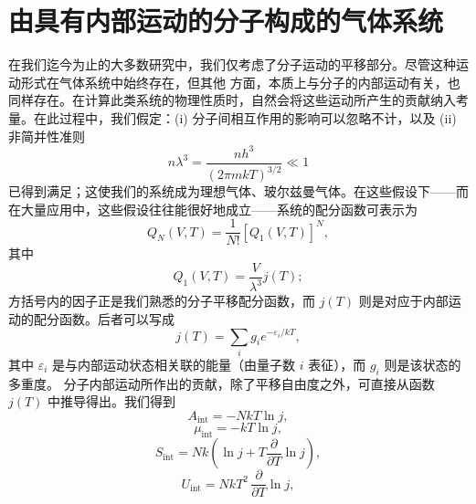 \section{由具有内部运动的分子构成的气体系统}\label{ux7531ux5177ux6709ux5185ux90e8ux8fd0ux52a8ux7684ux5206ux5b50ux6784ux6210ux7684ux6c14ux4f53ux7cfbux7edf}
在我们迄今为止的大多数研究中，我们仅考虑了分子运动的平移部分。尽管这种运动形式在气体系统中始终存在，但其他
方面，本质上与分子的内部运动有关，也同样存在。在计算此类系统的物理性质时，自然会将这些运动所产生的贡献纳入考量。在此过程中，我们假定：(i) 分子间相互作用的影响可以忽略不计，以及 (ii) 非简并性准则
\begin{equation}\tag{6.5.1}\label{eq:6.5.1}
n \lambda ^{3} = \frac { n h ^{3} } { ( 2 \pi m k T ) ^{3 / 2} } \ll 1
\end{equation}
已得到满足；这使我们的系统成为理想气体、玻尔兹曼气体。在这些假设下——而在大量应用中，这些假设往往能很好地成立——系统的配分函数可表示为
\begin{equation}\tag{6.5.2}\label{eq:6.5.2}
Q _ { N } ( V , T ) = \frac { 1 } { N ! } [ Q _ { 1 } ( V , T ) ] ^{N} ,
\end{equation}
其中
\begin{equation}\tag{6.5.3}\label{eq:6.5.3}
Q _ { 1 } ( V , T ) = \frac { V } { \lambda ^{3} } j ( T ) ;
\end{equation}
方括号内的因子正是我们熟悉的分子平移配分函数，而 \(j(T)\) 则是对应于内部运动的配分函数。后者可以写成
\begin{equation}\tag{6.5.4}\label{eq:6.5.4}
j ( T ) = \sum _ { i } g _ { i } e ^{- \varepsilon _ { i} / k T } ,
\end{equation}
其中 \(\varepsilon_{i}\) 是与内部运动状态相关联的能量（由量子数 \(i\) 表征），而 \(g_{i}\) 则是该状态的多重度。
分子内部运动所作出的贡献，除了平移自由度之外，可直接从函数 \(j(T)\) 中推导得出。我们得到
\begin{equation}\tag{6.5.5}\label{eq:6.5.5}
A _ { \mathrm { i n t } } = - N k T \ln j ,
\end{equation}
\begin{equation}\tag{6.5.6}\label{eq:6.5.6}
\mu _ { \mathrm { i n t } } = - k T \ln j ,
\end{equation}
\begin{equation}\tag{6.5.7}\label{eq:6.5.7}
S _ { \mathrm { i n t } } = N k \left( \ln j + T \frac { \partial } { \partial T } \ln j \right) ,
\end{equation}
\begin{equation}\tag{6.5.8}\label{eq:6.5.8}
U _ { \mathrm { i n t } } = N k T ^{2} \, \frac { \partial } { \partial T } \ln j ,
\end{equation}
